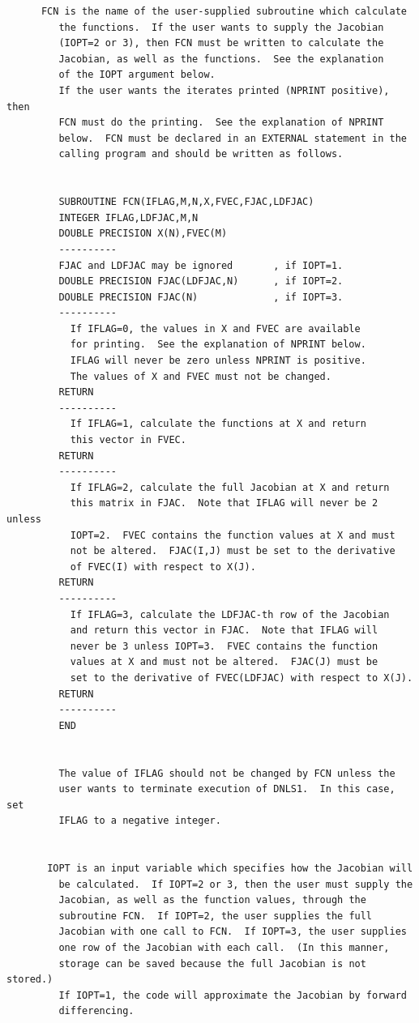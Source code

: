 \documentclass[11pt,twoside]{article}
\begin{document}
\begin{verbatim}
      FCN is the name of the user-supplied subroutine which calculate
         the functions.  If the user wants to supply the Jacobian
         (IOPT=2 or 3), then FCN must be written to calculate the
         Jacobian, as well as the functions.  See the explanation
         of the IOPT argument below.
         If the user wants the iterates printed (NPRINT positive), then
         FCN must do the printing.  See the explanation of NPRINT
         below.  FCN must be declared in an EXTERNAL statement in the
         calling program and should be written as follows.


         SUBROUTINE FCN(IFLAG,M,N,X,FVEC,FJAC,LDFJAC)
         INTEGER IFLAG,LDFJAC,M,N
         DOUBLE PRECISION X(N),FVEC(M)
         ----------
         FJAC and LDFJAC may be ignored       , if IOPT=1.
         DOUBLE PRECISION FJAC(LDFJAC,N)      , if IOPT=2.
         DOUBLE PRECISION FJAC(N)             , if IOPT=3.
         ----------
           If IFLAG=0, the values in X and FVEC are available
           for printing.  See the explanation of NPRINT below.
           IFLAG will never be zero unless NPRINT is positive.
           The values of X and FVEC must not be changed.
         RETURN
         ----------
           If IFLAG=1, calculate the functions at X and return
           this vector in FVEC.
         RETURN
         ----------
           If IFLAG=2, calculate the full Jacobian at X and return
           this matrix in FJAC.  Note that IFLAG will never be 2 unless
           IOPT=2.  FVEC contains the function values at X and must
           not be altered.  FJAC(I,J) must be set to the derivative
           of FVEC(I) with respect to X(J).
         RETURN
         ----------
           If IFLAG=3, calculate the LDFJAC-th row of the Jacobian
           and return this vector in FJAC.  Note that IFLAG will
           never be 3 unless IOPT=3.  FVEC contains the function
           values at X and must not be altered.  FJAC(J) must be
           set to the derivative of FVEC(LDFJAC) with respect to X(J).
         RETURN
         ----------
         END


         The value of IFLAG should not be changed by FCN unless the
         user wants to terminate execution of DNLS1.  In this case, set
         IFLAG to a negative integer.


       IOPT is an input variable which specifies how the Jacobian will
         be calculated.  If IOPT=2 or 3, then the user must supply the
         Jacobian, as well as the function values, through the
         subroutine FCN.  If IOPT=2, the user supplies the full
         Jacobian with one call to FCN.  If IOPT=3, the user supplies
         one row of the Jacobian with each call.  (In this manner,
         storage can be saved because the full Jacobian is not stored.)
         If IOPT=1, the code will approximate the Jacobian by forward
         differencing.


\end{verbatim}
\end{document}
